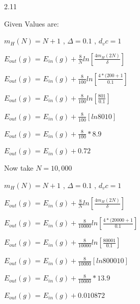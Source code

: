 \documentclass[12pt]{article}
\begin{document}
2.11

Given Values are:

$m_H(N)=N+1$ , $\Delta=0.1$ , $d_vc=1$


$E_{out}(g)$ = $E_{in}(g)+\frac{8}{N}ln[\frac{4m_H(2N)}{\delta}]$



$E_{out}(g)$ = $E_{in}(g)+\frac{8}{100}ln[\frac{4*(200+1}{0.1}]$



$E_{out}(g)$ = $E_{in}(g)+\frac{8}{100}ln[\frac{ 801}{0.1}]$




$E_{out}(g)$ = $E_{in}(g)+\frac{8}{100}[{ln 8010}]$



$E_{out}(g)$ = $E_{in}(g)+\frac{8}{100} * 8.9 $



$E_{out}(g)$ = $E_{in}(g)+0.72 $




Now take $N=10,000$



$m_H(N)=N+1$ , $\Delta=0.1$ , $d_vc=1$



$E_{out}(g)$ = $E_{in}(g)+\frac{8}{N}ln[\frac{4m_H(2N)}{\delta}]$



$E_{out}(g)$ = $E_{in}(g)+\frac{8}{10000}ln[\frac{4*(20000+1}{0.1}]$




$E_{out}(g)$ = $E_{in}(g)+\frac{8}{10000}ln[\frac{ 80001}{0.1}]$



$E_{out}(g)$ = $E_{in}(g)+\frac{8}{10000}[{ln 800010}]$




$E_{out}(g)$ = $E_{in}(g)+\frac{8}{10000} * 13.9 $




$E_{out}(g)$ = $E_{in}(g)+0.010872 $
\end{document}
